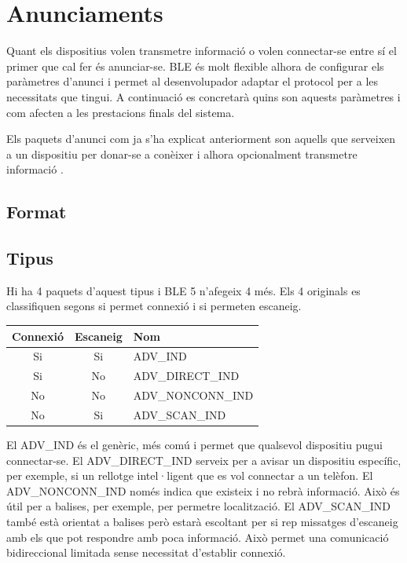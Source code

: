 \section{Anunciaments}
Quant els dispositius volen transmetre informació o volen connectar-se entre sí el primer que cal fer és anunciar-se.
BLE és molt flexible alhora de configurar els paràmetres d'anunci i permet al desenvolupador adaptar el protocol per a les necessitats que tingui.
A continuació es concretarà quins son aquests paràmetres i com afecten a les prestacions finals del sistema.

Els paquets d'anunci com ja s'ha explicat anteriorment son aquells que serveixen a un dispositiu per donar-se a conèixer i alhora opcionalment transmetre informació \cite{Advertising}.

\subsection{Format}

\subsection{Tipus}
Hi ha 4 paquets d'aquest tipus i BLE 5 n'afegeix 4 més.
Els 4 originals es classifiquen segons si permet connexió i si permeten escaneig.

\begin{center}
	\begin{tabular}{|c|c|l|}
		\hline
		Connexió	&	Escaneig	&	Nom	\\	\hline
		Si			&	Si			&	ADV\_IND	\\	\hline
		Si			&	No			&	ADV\_DIRECT\_IND	\\	\hline
		No			&	No			&	ADV\_NONCONN\_IND	\\	\hline
		No			&	Si			&	ADV\_SCAN\_IND	\\	\hline
	\end{tabular}
\end{center}

El ADV\_IND és el genèric, més comú i permet que qualsevol dispositiu pugui connectar-se.
El ADV\_DIRECT\_IND serveix per a avisar un dispositiu específic, per exemple, si un rellotge intel·ligent que es vol connectar a un telèfon.
El ADV\_NONCONN\_IND només indica que existeix i no rebrà informació.
Això és útil per a balises, per exemple, per permetre localització.
El ADV\_SCAN\_IND també està orientat a balises però estarà escoltant per si rep missatges d'escaneig amb els que pot respondre amb poca informació.
Això permet una comunicació bidireccional limitada sense necessitat d'establir connexió.

